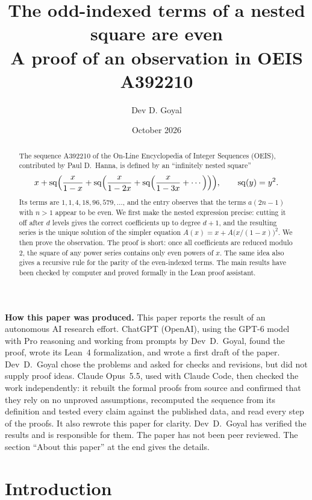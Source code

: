 \documentclass[11pt,a4paper]{article}
\title{The odd-indexed terms of a nested square are even\\[6pt]\large A proof of an observation in OEIS A392210}
\author{Dev D. Goyal}
\date{October 2026}
\theoremstyle{definition}
\theoremstyle{remark}
\begin{document}
\maketitle
\begin{abstract}
The sequence A392210 of the On-Line Encyclopedia of Integer Sequences (OEIS), contributed by Paul D.~Hanna, is defined
by an ``infinitely nested square''
\[
x+\mathrm{sq}\Bigl(\frac{x}{1-x}+\mathrm{sq}\Bigl(\frac{x}{1-2x}+\mathrm{sq}\Bigl(\frac{x}{1-3x}+\cdots\Bigr)\Bigr)\Bigr),
\qquad \mathrm{sq}(y)=y^2 .
\]
Its terms are $1,1,4,18,96,579,\dots$, and the entry observes that the terms $a(2n-1)$ with $n>1$ appear to be even.
We first make the nested expression precise: cutting it off after $d$ levels gives the correct coefficients up to
degree $d+1$, and the resulting series is the unique solution of the simpler equation $A(x)=x+A\bigl(x/(1-x)\bigr)^2$.
We then prove the observation. The proof is short: once all coefficients are reduced modulo $2$, the square of any power
series contains only even powers of $x$. The same idea also gives a recursive rule for the parity of the even-indexed
terms. The main results have been checked by computer and proved formally in the Lean proof assistant.
\end{abstract}
\begin{center}\begin{minipage}{0.88\linewidth}\small
\textbf{How this paper was produced.} This paper reports the result of an autonomous AI research effort.
ChatGPT (OpenAI), using the GPT-6 model with Pro reasoning and working from prompts by Dev~D.~Goyal, found the proof, wrote its Lean~4 formalization, and wrote a first draft of the paper.
Dev~D.~Goyal chose the problems and asked for checks and revisions, but did not supply proof ideas.
Claude Opus~5.5, used with Claude Code, then checked the work independently: it rebuilt the formal proofs from
source and confirmed that they rely on no unproved assumptions, recomputed the sequence from its definition and tested
every claim against the published data, and read every step of the proofs. It also rewrote this paper for clarity.
Dev~D.~Goyal has verified the results and is responsible for them. The paper has not been peer reviewed.
The section ``About this paper'' at the end gives the details.
\end{minipage}\end{center}

\section{Introduction}
\end{document}
